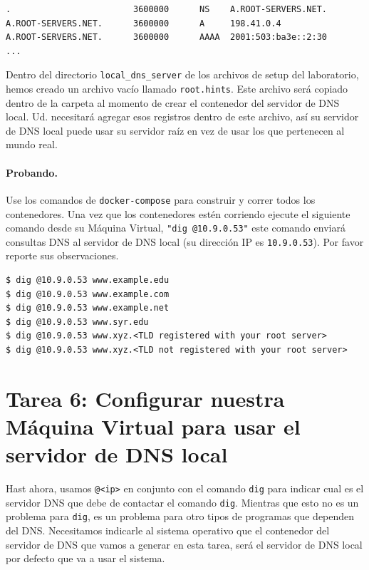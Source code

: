 \begin{lstlisting}
.                        3600000      NS    A.ROOT-SERVERS.NET.
A.ROOT-SERVERS.NET.      3600000      A     198.41.0.4
A.ROOT-SERVERS.NET.      3600000      AAAA  2001:503:ba3e::2:30
...
\end{lstlisting}

Dentro del directorio \texttt{local\_dns\_server} de los archivos de setup del laboratorio, hemos creado un archivo vacío llamado \texttt{root.hints}. Este archivo será copiado dentro de la carpeta  al momento de crear el contenedor del servidor de DNS local.
Ud. necesitará agregar esos registros dentro de este archivo, así su servidor de DNS local puede usar su servidor raíz en vez de usar los que pertenecen al mundo real.


\paragraph{Probando.} Use los comandos de \texttt{docker-compose} para construir y correr todos los contenedores.
Una vez que los contenedores estén corriendo ejecute el siguiente comando desde su Máquina Virtual, \texttt{"dig @10.9.0.53"} este comando enviará consultas DNS al servidor de DNS local (su dirección IP es  \texttt{10.9.0.53}).
Por favor reporte sus observaciones.

\begin{lstlisting}
$ dig @10.9.0.53 www.example.edu
$ dig @10.9.0.53 www.example.com
$ dig @10.9.0.53 www.example.net
$ dig @10.9.0.53 www.syr.edu
$ dig @10.9.0.53 www.xyz.<TLD registered with your root server>
$ dig @10.9.0.53 www.xyz.<TLD not registered with your root server>
\end{lstlisting}



\section{Tarea 6: Configurar nuestra Máquina Virtual para usar el servidor de DNS local} 

Hast ahora, usamos \texttt{@<ip>} en conjunto con el comando \texttt{dig} para indicar cual es el servidor DNS que debe de contactar el comando \texttt{dig}. Mientras que esto no es un problema para \texttt{dig}, es un problema para otro tipos de programas que dependen del DNS. Necesitamos indicarle al sistema operativo que el contenedor del servidor de DNS que vamos a generar en esta tarea, será el servidor de DNS local por defecto que va a usar el sistema.

